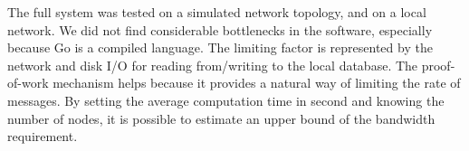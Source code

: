 \documentclass[a4paper,12pt]{article}
\begin{document}
The full system was tested on a simulated network topology, and on a local network. We did not find considerable bottlenecks in the software, especially because Go is a compiled language. The limiting factor is represented by the network and disk I/O for reading from/writing to the local database. The proof-of-work mechanism helps because it provides a natural way of limiting the rate of messages. By setting the average computation time in second and knowing the number of nodes, it is possible to estimate an upper bound of the bandwidth requirement.
\end{document}
